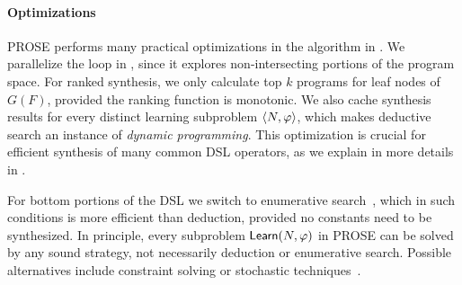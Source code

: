 \paragraph{Optimizations}
PROSE performs many practical optimizations in the algorithm in .
We parallelize the loop in , since it explores non-intersecting portions of the program space.
For ranked synthesis, we only calculate top $k$ programs for leaf nodes of $G(F)$, provided the ranking
function is monotonic.
We also cache synthesis results for every distinct learning subproblem $\langle N, \varphi\rangle$, which makes
deductive search an instance of \emph{dynamic programming}.
This optimization is crucial for efficient synthesis of many common DSL operators, as we explain in more details in
.

For bottom portions of the DSL we switch to enumerative
search~\cite{transit:protocols}, which in such conditions is more efficient than deduction, provided no constants need
to be synthesized.
In principle, every subproblem $\mathsf{Learn}(N, \varphi)$ in PROSE can be solved by any sound strategy, not
necessarily deduction or enumerative search.
Possible alternatives include constraint solving or stochastic techniques~\cite{sygus}.
